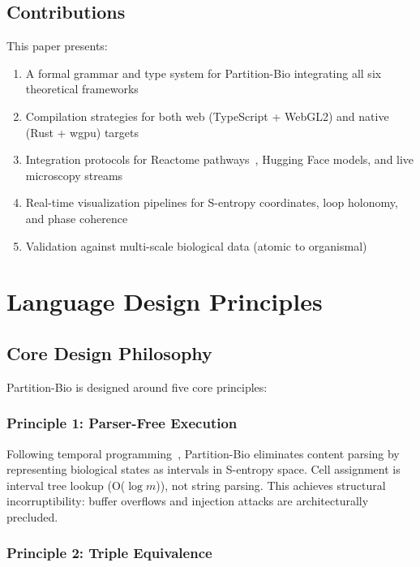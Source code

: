 \documentclass[12pt,a4paper]{article}
\begin{document}
\subsection{Contributions}

This paper presents:

\begin{enumerate}
    \item A formal grammar and type system for Partition-Bio integrating all six theoretical frameworks
    \item Compilation strategies for both web (TypeScript + WebGL2) and native (Rust + wgpu) targets
    \item Integration protocols for Reactome pathways~\cite{reactome2026}, Hugging Face models, and live microscopy streams
    \item Real-time visualization pipelines for S-entropy coordinates, loop holonomy, and phase coherence
    \item Validation against multi-scale biological data (atomic to organismal)
\end{enumerate}

\section{Language Design Principles}

\subsection{Core Design Philosophy}

Partition-Bio is designed around five core principles:

\subsubsection{Principle 1: Parser-Free Execution}

Following temporal programming~\cite{sachikonye2026temporal}, Partition-Bio eliminates content parsing by representing biological states as intervals in S-entropy space. Cell assignment is interval tree lookup (O($\log m$)), not string parsing. This achieves structural incorruptibility: buffer overflows and injection attacks are architecturally precluded.

\subsubsection{Principle 2: Triple Equivalence}
\end{document}
